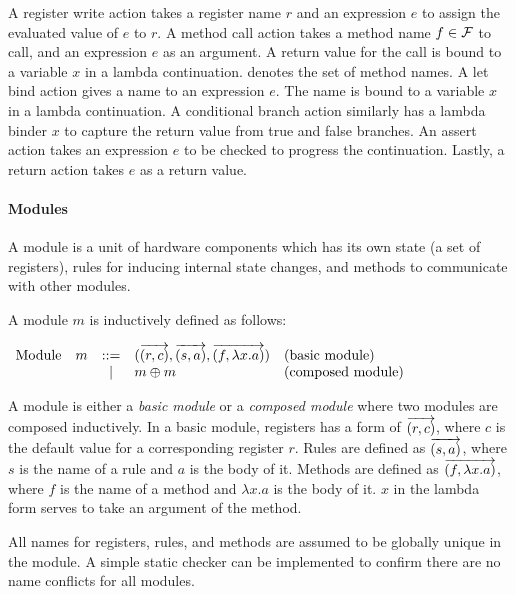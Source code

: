 A register write action takes a register name $r$ and an expression
$e$ to assign the evaluated value of $e$ to $r$. A method call action
takes a method name $f \in \mathcal{F}{}$ to call, and an expression $e$
as an argument. A return value for the call is bound to a variable $x$
in a lambda continuation. \setmeths{} denotes the set of method
names. A let bind action gives a name to an expression $e$. The name
is bound to a variable $x$ in a lambda continuation. A conditional
branch action similarly has a lambda binder $x$ to capture the return
value from true and false branches. An assert action takes an
expression $e$ to be checked to progress the continuation. Lastly, a
return action takes $e$ as a return value.

\paragraph{Modules}
A module is a unit of hardware components which has its own state (a
set of registers), rules for inducing internal state changes, and
methods to communicate with other modules.

\begin{definition}
  \label{def-module}
  A module $m$ is inductively defined as follows:
  \begin{center}
    \begin{math}
      \begin{array}{rcll}
        \textrm{Module}\quad m & ::=
        & (\overrightarrow{(r, c)}, \overrightarrow{(s, a)}, \overrightarrow{(f, \lambda x.a)})
        & \textrm{(basic module)} \\
        & | & m \oplus m & \textrm{(composed module)}
      \end{array}
    \end{math}
  \end{center}
\end{definition}

A module is either a \emph{basic module} or a \emph{composed module}
where two modules are composed inductively. In a basic module,
registers has a form of $\overrightarrow{(r, c)}$, where $c$ is the
default value for a corresponding register $r$. Rules are defined as
$\overrightarrow{(s, a)}$, where $s$ is the name of a rule and $a$ is
the body of it. Methods are defined as $\overrightarrow{(f, \lambda
    x.a)}$, where $f$ is the name of a method and $\lambda x.a$ is the
body of it. $x$ in the lambda form serves to take an argument of the
method.

All names for registers, rules, and methods are assumed to be globally
unique in the module. A simple static checker can be implemented to
confirm there are no name conflicts for all modules.

